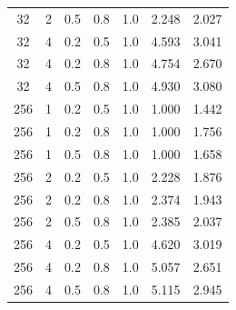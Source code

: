 \begin{table}
\begin{tabular}{|c|c|c|c|c|c|c|}
     32 &       2 & 0.5 & 0.8 &            1.0 &          2.248 &               2.027 \\
     32 &       4 & 0.2 & 0.5 &            1.0 &          4.593 &               3.041 \\
     32 &       4 & 0.2 & 0.8 &            1.0 &          4.754 &               2.670 \\
     32 &       4 & 0.5 & 0.8 &            1.0 &          4.930 &               3.080 \\
    256 &       1 & 0.2 & 0.5 &            1.0 &          1.000 &               1.442 \\
    256 &       1 & 0.2 & 0.8 &            1.0 &          1.000 &               1.756 \\
    256 &       1 & 0.5 & 0.8 &            1.0 &          1.000 &               1.658 \\
    256 &       2 & 0.2 & 0.5 &            1.0 &          2.228 &               1.876 \\
    256 &       2 & 0.2 & 0.8 &            1.0 &          2.374 &               1.943 \\
    256 &       2 & 0.5 & 0.8 &            1.0 &          2.385 &               2.037 \\
    256 &       4 & 0.2 & 0.5 &            1.0 &          4.620 &               3.019 \\
    256 &       4 & 0.2 & 0.8 &            1.0 &          5.057 &               2.651 \\
    256 &       4 & 0.5 & 0.8 &            1.0 &          5.115 &               2.945 \\
\bottomrule
\end{tabular}
\end{table}

\newpage

